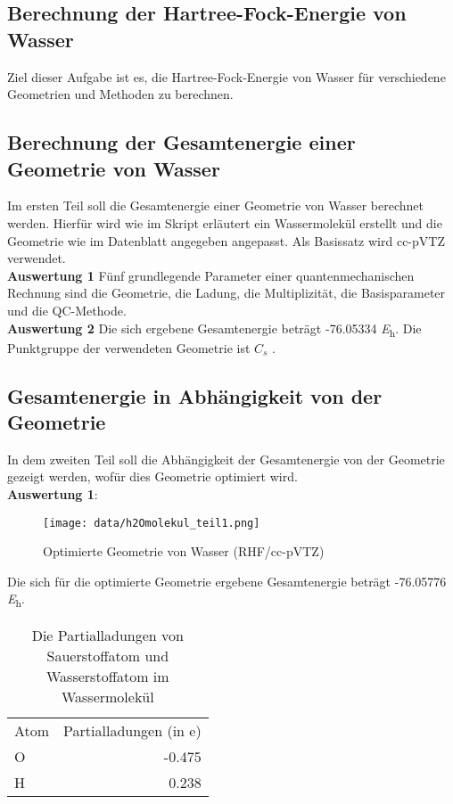 \documentclass[12pt]{article}
\begin{document}
\begin{onehalfspace}

\section{Berechnung der Hartree-Fock-Energie von Wasser}
Ziel dieser Aufgabe ist es, die Hartree-Fock-Energie von Wasser für verschiedene Geometrien und Methoden zu berechnen.
\subsection{Berechnung der Gesamtenergie einer Geometrie von Wasser}
Im ersten Teil soll die Gesamtenergie einer Geometrie von Wasser berechnet werden. Hierfür wird wie im Skript erläutert ein Wassermolekül erstellt und die Geometrie wie im Datenblatt angegeben angepasst. Als Basissatz wird cc-pVTZ verwendet. \\
\textbf{Auswertung 1} Fünf grundlegende Parameter einer quantenmechanischen Rechnung sind die Geometrie, die Ladung, die Multiplizität, die Basisparameter und die QC-Methode. \\
\textbf{Auswertung 2} Die sich ergebene Gesamtenergie beträgt -76.05334 \si{\hartree}.
Die Punktgruppe der verwendeten Geometrie ist $C _s$ .\\
\subsection{Gesamtenergie in Abhängigkeit von der Geometrie}
In dem zweiten Teil soll die Abhängigkeit der Gesamtenergie von der Geometrie gezeigt werden, wofür dies Geometrie optimiert wird.\\
\textbf{Auswertung 1}:\\
\begin{figure}[!htbp]
\centering
\texttt{[image: data/h2Omolekul\_teil1.png]}
  \caption{Optimierte Geometrie von Wasser (RHF/cc-pVTZ)}
\end{figure}
\noindent
Die sich für die optimierte Geometrie ergebene Gesamtenergie beträgt -76.05776 \si{\hartree}. \\
\begin{table}[htbp]
\centering
\caption{Die Partialladungen von Sauerstoffatom und Wasserstoffatom im Wassermolekül}
\begin{tabular}{lr}
\toprule
Atom &  Partialladungen (in e)\\
O & -0.475\\
H & 0.238\\
\midrule
\bottomrule


\end{tabular}
\end{table}
\end{onehalfspace}
\end{document}
